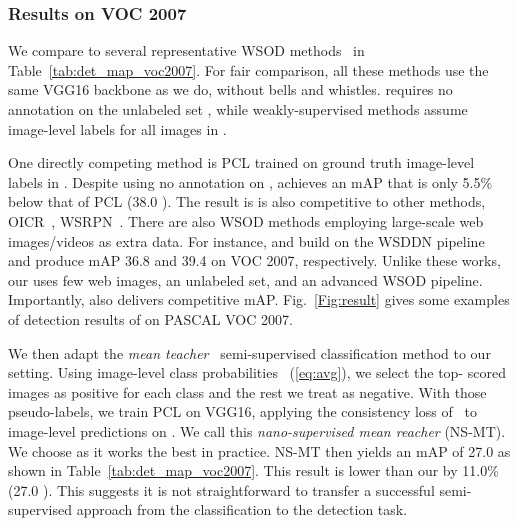 \documentclass[review]{elsarticle}
\begin{document}
\subsubsection{Results on VOC 2007}\label{sec:results-voc2007}
We compare to several representative WSOD methods~\cite{wsddn,tang2017cvpr,tang2018eccv,tang2018pami,shen2019cvpr} in Table~\ref{tab:det_map_voc2007}. For fair comparison, all these methods use the same VGG16 backbone as we do, without bells and whistles.
\ours requires no annotation on the unlabeled set , while weakly-supervised methods assume image-level labels for all images in .

One directly competing method is PCL trained on ground truth image-level labels in . Despite using no annotation on , \ours achieves an mAP that is only 5.5\% below that of PCL (38.0 ). The result is is also competitive to other methods, \eg OICR~\cite{tang2017cvpr}, WSRPN~\cite{tang2018pami}. {There are also WSOD methods employing large-scale web images/videos as extra data. For instance, \cite{tao2018tmm} and \cite{singh2019cvpr} build on the WSDDN pipeline~\cite{wsddn} and produce mAP 36.8 and 39.4 on VOC 2007, respectively. Unlike these works, our \ours uses few web images, an unlabeled set, and an advanced WSOD pipeline. Importantly, \ours also delivers competitive mAP.}
Fig.~\ref{Fig:result} gives some examples of detection results of \ours on PASCAL VOC 2007.

 

We then adapt the \emph{mean teacher}~\cite{TV17} semi-supervised classification method to our setting. Using image-level class probabilities ~(\ref{eq:avg}), we select the top- scored images as positive for each class and the rest we treat as negative.
With those pseudo-labels, we train PCL on VGG16, applying the consistency loss of~\cite{TV17} to image-level predictions on . We call this \emph{nano-supervised mean reacher} (NS-MT).
We choose  as it works the best in practice. NS-MT then yields an mAP of 27.0 as shown in Table~\ref{tab:det_map_voc2007}. This result is lower than our \ours by {11.0\%} ({27.0} ). This suggests it is not straightforward to transfer a successful semi-supervised approach from the classification to the detection task.
\end{document}
